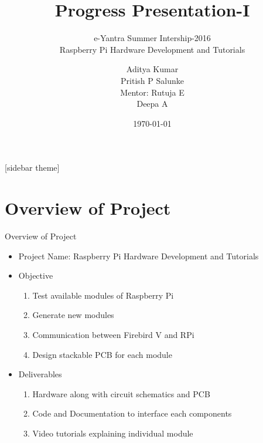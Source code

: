 \documentclass[10pt, a4paper]{beamer}
\begin{document}
	\title{Progress Presentation-I}
	\subtitle{e-Yantra Summer Intership-2016 \\ Raspberry Pi Hardware Development and Tutorials}
	\author{Aditya Kumar\\Pritish P Salunke\\
	Mentor: Rutuja E \\ Deepa A}
	\date{\today}
	\frame{\titlepage}

[sidebar theme]
\section{Overview of Project}
\begin{frame}{Overview of Project}
	\begin{itemize}
		\item Project Name: Raspberry Pi Hardware Development and Tutorials
		\item Objective
		\begin{enumerate}
			\item Test available modules of Raspberry Pi
			\item Generate new modules
			\item Communication between Firebird V and RPi
			\item Design stackable PCB for each module
		\end{enumerate}
		\item Deliverables
		\begin{enumerate}
			\item Hardware along with circuit schematics and PCB
			\item Code and Documentation to interface each components
			\item Video tutorials explaining individual module
		\end{enumerate}
	\end{itemize}
\end{frame}
\end{document}
